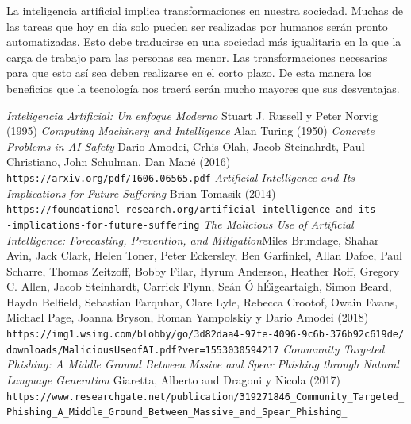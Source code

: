 \documentclass[12pt,a4paper]{article}
\begin{document}
La inteligencia artificial implica transformaciones en nuestra sociedad. Muchas de las tareas que hoy en día solo pueden ser realizadas por humanos serán pronto automatizadas. Esto debe traducirse en una sociedad más igualitaria en la que la carga de trabajo para las personas sea menor. Las transformaciones necesarias para que esto así sea deben realizarse en el corto plazo. De esta manera los beneficios que la tecnología nos traerá serán mucho mayores que sus desventajas.

\newpage

\begin{thebibliography}{9}

 \textit{Inteligencia Artificial: Un enfoque Moderno} Stuart J. Russell y Peter Norvig (1995)
\textit{Computing Machinery and Intelligence} Alan Turing (1950)
 \textit{Concrete Problems in AI Safety} Dario Amodei, Crhis Olah, Jacob Steinahrdt, Paul Christiano, John Schulman, Dan Mané (2016)
\\\texttt{https://arxiv.org/pdf/1606.06565.pdf}
 \textit{Artificial Intelligence and Its Implications for Future Suffering} Brian Tomasik (2014)
\\\texttt{https://foundational-research.org/artificial-intelligence-and-its}
\\\texttt{-implications-for-future-suffering}
 \textit{The Malicious Use of Artificial Intelligence: Forecasting, Prevention, and Mitigation}Miles Brundage, Shahar Avin,  Jack Clark, Helen Toner, Peter Eckersley, Ben Garfinkel, Allan Dafoe, Paul Scharre, Thomas Zeitzoff, Bobby Filar, Hyrum Anderson, Heather Roff, Gregory C. Allen, Jacob Steinhardt, Carrick Flynn, Seán Ó hÉigeartaigh, Simon Beard, Haydn Belfield, Sebastian Farquhar, Clare Lyle, Rebecca Crootof, Owain Evans, Michael Page, Joanna Bryson, Roman Yampolskiy y Dario Amodei (2018)
\\\texttt{https://img1.wsimg.com/blobby/go/3d82daa4-97fe-4096-9c6b-376b92c619de/}
\\\texttt{downloads/MaliciousUseofAI.pdf?ver=1553030594217}
 \textit{Community Targeted Phishing: A Middle Ground Between Mssive and Spear Phishing through Natural Language Generation} Giaretta, Alberto and Dragoni y Nicola (2017)
\\\texttt{https://www.researchgate.net/publication/319271846\_Community\_Targeted\_}
\\\texttt{Phishing\_A\_Middle\_Ground\_Between\_Massive\_and\_Spear\_Phishing\_}

\end{thebibliography}
\end{document}
